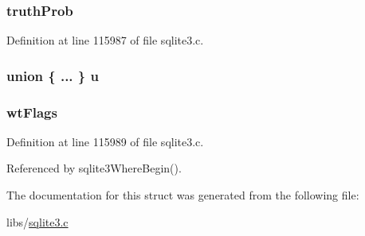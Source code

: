 \subsubsection[{truth\+Prob}]{ truth\+Prob}\label{struct_where_term_ada1f7e88cbf8154b8f353eb87f753e95}


Definition at line 115987 of file sqlite3.\+c.

\hypertarget{struct_where_term_a1afabdefa580020042ecaa0c1cc72ea7}{}
\subsubsection[{u}]{\setlength{\rightskip}{0pt plus 5cm}union \{ ... \}   u}\label{struct_where_term_a1afabdefa580020042ecaa0c1cc72ea7}
\hypertarget{struct_where_term_a2fca16b07d01ffb5660833e875675401}{}
\subsubsection[{wt\+Flags}]{ wt\+Flags}\label{struct_where_term_a2fca16b07d01ffb5660833e875675401}


Definition at line 115989 of file sqlite3.\+c.



Referenced by sqlite3\+Where\+Begin().



The documentation for this struct was generated from the following file\+:\begin{DoxyCompactItemize}
\item 
libs/\hyperlink{sqlite3_8c}{sqlite3.\+c}\end{DoxyCompactItemize}
